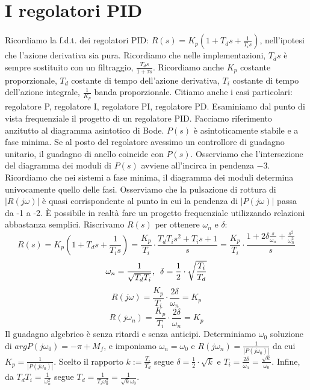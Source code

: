 \documentclass[11pt]{article}
\begin{document}
\section{I regolatori PID}
Ricordiamo la f.d.t. dei regolatori PID: $R(s)=K_p\left(1+T_ds+\frac{1}{T_is}\right)$, nell'ipotesi che l'azione derivativa sia pura. Ricordiamo che nelle implementazioni, $T_d s$ è sempre sostituito con un filtraggio, $\frac{T_ds}{1+\tau s}$. Ricordiamo anche $K_p$ costante proporzionale, $T_d$ costante di tempo dell'azione derivativa, $T_i$ costante di tempo dell'azione integrale, $\frac{1}{K_p}$ banda proporzionale. Citiamo anche i casi particolari: regolatore P, regolatore I, regolatore PI, regolatore PD.
Esaminiamo dal punto di vista frequenziale il progetto di un regolatore PID. Facciamo riferimento anzitutto al diagramma asintotico di Bode. $P(s)$ è asintoticamente stabile e a fase minima. Se al posto del regolatore avessimo un controllore di guadagno unitario, il guadagno di anello coincide con $P(s)$. Osserviamo che l'intersezione del diagramma dei moduli di $P(s)$ avviene all'incirca in pendenza $-3$. Ricordiamo che nei sistemi a fase minima, il diagramma dei moduli determina univocamente quello delle fasi.
Osserviamo che la pulsazione di rottura di $|R(j\omega)|$ è quasi corrispondente al punto in cui la pendenza di $|P(j\omega)|$ passa da -1 a -2. È possibile in realtà fare un progetto frequenziale utilizzando relazioni abbastanza semplici. Riscrivamo $R(s)$ per ottenere $\omega_n$ e $\delta$:
\begin{displaymath}
    R(s)=K_p\left(1+T_ds+\frac{1}{T_is}\right)=\frac{K_p}{T_i}\cdot\frac{T_dT_is^2+T_is+1}{s}=\frac{K_p}{T_i}\cdot\frac{1+2\delta\frac{s}{\omega_n}+\frac{s^2}{\omega_n^2}}{s}
\end{displaymath}
\begin{displaymath}
    \omega_n = \frac{1}{\sqrt{T_dT_i}}, \hspace{5px}\delta=\frac{1}{2}\cdot\sqrt{\frac{T_i}{T_d}}
\end{displaymath}
\begin{displaymath}
    R(j\omega) = \frac{K_p}{T_i}\cdot\frac{2\delta}{\omega_n}=K_p
\end{displaymath}
\begin{displaymath}
    R(j\omega_n)=\frac{K_p}{T_i}\cdot\frac{2\delta}{\omega_n}=K_p
\end{displaymath}
Il guadagno algebrico è senza ritardi e senza anticipi. Determiniamo $\omega_0$ soluzione di $argP(j\omega_0)=-\pi+M_f$, e imponiamo $\omega_n = \omega_0$ e $R(j\omega_n)=\frac{1}{|P(j\omega_0)|}$ da cui $K_p=\frac{1}{|P(j\omega_0)|}$. Scelto il rapporto $k :=\frac{T_i}{T_d}$ segue $\delta =\frac{1}{2}\cdot\sqrt{k}$ e $T_i=\frac{2\delta}{\omega_n}=\frac{\sqrt{k}}{\omega_0}$. Infine, da $T_dT_i = \frac{1}{\omega_n^2}$ segue $T_d = \frac{1}{T_i\omega_0^2} = \frac{1}{\sqrt{k}\omega_0}$.
\end{document}
